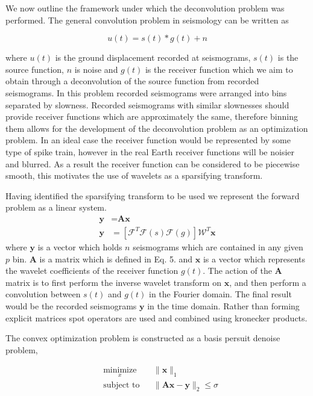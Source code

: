 \documentclass[jgrga]{agutex}
\begin{document}
\begin{article}
We now outline the framework under which the deconvolution problem was performed. The general convolution problem in seismology can be written as 

\begin{equation}
	u(t) = s(t)\ast g(t) + n
\end{equation}

where $u(t)$ is the ground displacement recorded at seismograms, $s(t)$ is the source function, $n$ is noise and $g(t)$ is the receiver function which we aim to obtain through a deconvolution of the source function from recorded seismograms. In this problem recorded seismograms were arranged into bins separated by slowness. Recorded seismograms with similar slownesses should provide receiver functions which are approximately the same, therefore binning them allows for the development of the deconvolution problem as an optimization problem. In an ideal case the receiver function would be represented by some type of spike train, however in the real Earth receiver functions will be noisier and blurred. As a result the receiver function can be considered to be piecewise smooth, this motivates the use of wavelets as a sparsifying transform. 

Having identified the sparsifying transform to be used we represent the forward problem as a linear system.
\begin{equation}
\begin{aligned}
\textbf{y}& =\textbf{A}\textbf{x}\\
\textbf{y}& =[\mathcal{F}^{T}\mathcal{F}(s)\mathcal{F}(g)]\mathcal{W}^{T}\textbf{x}
\end{aligned}
\end{equation}
where $\textbf{y}$ is a vector which holds $n$ seismograms which are contained in any given $p$ bin. $\textbf{A}$ is a matrix which is defined in Eq. 5. and $\textbf{x}$ is a vector 
which represents the wavelet coefficients of the receiver function $g(t)$. The action of the $\textbf{A}$ matrix is to first perform the inverse wavelet transform on $\textbf{x}$, and then perform a convolution between $s(t)$ and $g(t)$ in the Fourier domain. The final result would be the recorded seismograms $\textbf{y}$ in the time domain. Rather than forming explicit matrices spot operators are used and combined using kronecker products.  

The convex optimization problem is constructed as a basis persuit denoise problem,

\begin{equation}
\begin{aligned}
& \underset{x}{\text{minimize}}
& & \lVert\textbf{x}\rVert_{1} \\
& \text{subject to}
& & \lVert\textbf{Ax}-\textbf{y}\rVert_{2} \leq \sigma
\end{aligned}
\end{equation}


\end{article}
\end{document}
